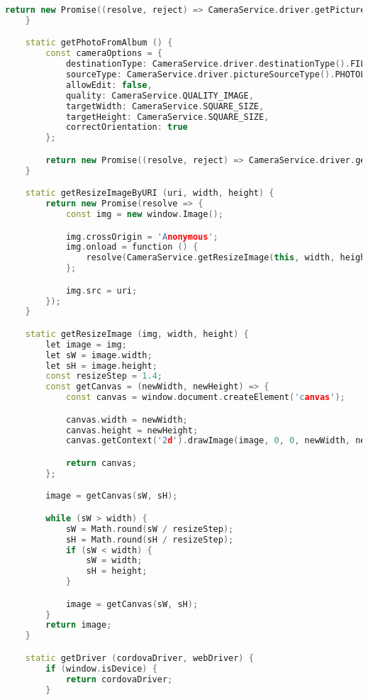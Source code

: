 \begin{lstlisting}[language=C++, style=cplusplusstyle]
        return new Promise((resolve, reject) => CameraService.driver.getPicture(photoURI => resolve(photoURI), error => reject(error), cameraOptions));
    }

    static getPhotoFromAlbum () {
        const cameraOptions = {
            destinationType: CameraService.driver.destinationType().FILE_URI,
            sourceType: CameraService.driver.pictureSourceType().PHOTOLIBRARY,
            allowEdit: false,
            quality: CameraService.QUALITY_IMAGE,
            targetWidth: CameraService.SQUARE_SIZE,
            targetHeight: CameraService.SQUARE_SIZE,
            correctOrientation: true
        };

        return new Promise((resolve, reject) => CameraService.driver.getPicture(photoURI => resolve(photoURI), error => reject(error), cameraOptions));
    }

    static getResizeImageByURI (uri, width, height) {
        return new Promise(resolve => {
            const img = new window.Image();

            img.crossOrigin = 'Anonymous';
            img.onload = function () {
                resolve(CameraService.getResizeImage(this, width, height).toDataURL());
            };

            img.src = uri;
        });
    }

    static getResizeImage (img, width, height) {
        let image = img;
        let sW = image.width;
        let sH = image.height;
        const resizeStep = 1.4;
        const getCanvas = (newWidth, newHeight) => {
            const canvas = window.document.createElement('canvas');

            canvas.width = newWidth;
            canvas.height = newHeight;
            canvas.getContext('2d').drawImage(image, 0, 0, newWidth, newHeight);

            return canvas;
        };

        image = getCanvas(sW, sH);

        while (sW > width) {
            sW = Math.round(sW / resizeStep);
            sH = Math.round(sH / resizeStep);
            if (sW < width) {
                sW = width;
                sH = height;
            }

            image = getCanvas(sW, sH);
        }
        return image;
    }

    static getDriver (cordovaDriver, webDriver) {
        if (window.isDevice) {
            return cordovaDriver;
        }


\end{lstlisting}
